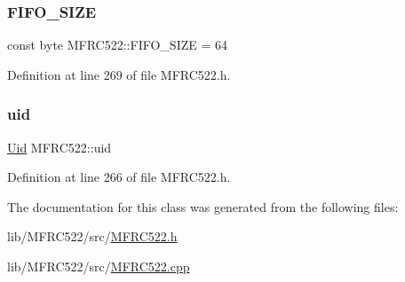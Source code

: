 \subsubsection{\texorpdfstring{F\+I\+F\+O\+\_\+\+S\+I\+ZE}{FIFO\_SIZE}}
{\footnotesize\ttfamily const byte M\+F\+R\+C522\+::\+F\+I\+F\+O\+\_\+\+S\+I\+ZE = 64\hspace{0.3cm}{\ttfamily [static]}}



Definition at line 269 of file M\+F\+R\+C522.\+h.

\mbox{\label{class_m_f_r_c522_ad456545d41962dd7f8bd4210f5618498}} 
\subsubsection{\texorpdfstring{uid}{uid}}
{\footnotesize\ttfamily \hyperlink{struct_m_f_r_c522_1_1_uid}{Uid} M\+F\+R\+C522\+::uid}



Definition at line 266 of file M\+F\+R\+C522.\+h.



The documentation for this class was generated from the following files\+:\begin{DoxyCompactItemize}
\item 
lib/\+M\+F\+R\+C522/src/\hyperlink{_m_f_r_c522_8h}{M\+F\+R\+C522.\+h}\item 
lib/\+M\+F\+R\+C522/src/\hyperlink{_m_f_r_c522_8cpp}{M\+F\+R\+C522.\+cpp}\end{DoxyCompactItemize}
